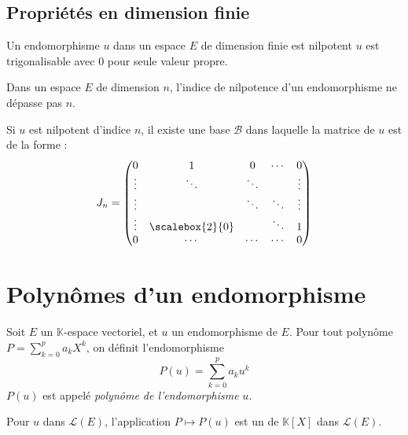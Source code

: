 \documentclass[11pt,a4paper,fleqn,pdftex]{report}
\begin{document}
\subsection{Propriétés en dimension finie} %
\label{sub:proprietes_en_dimension_finie}
\begin{theorem}
     Un endomorphisme $u$ dans un espace $E$ de dimension finie est nilpotent \ssi $u$ est trigonalisable avec $0$ pour seule valeur propre.
\end{theorem}
\begin{theorem}
     Dans un espace $E$ de dimension $n$, l'indice de nilpotence d'un endomorphisme ne dépasse pas $n$. \par
     Si $u$ est nilpotent d'indice $n$, il existe une base $\mathcal{B}$ dans laquelle la matrice de $u$ est de la forme :
     \begin{equation}
     J_n=
     \begin{pmatrix}
             0   &         1       &    0   & \cdots &    0   \\
          \vdots &      \ddots     & \ddots &        & \vdots \\
          \vdots &                 & \ddots & \ddots & \vdots \\
          \vdots & \scalebox{2}{0} &        & \ddots &    1   \\
             0   &      \cdots     & \cdots & \cdots &    0  
     \end{pmatrix}
     \end{equation}
\end{theorem}
\section{Polynômes d'un endomorphisme} %
\label{sec:polyn_mes_d_un_endomorphisme}
\begin{dfn}
     Soit $E$ un $\mathbb{K}$-espace vectoriel, et $u$ un endomorphisme de $E$. \newline
     Pour tout polynôme $P = \sum_{k=0}^p a_k X^k$, on définit l'endomorphisme 
     \begin{equation}
     P(u) = \sum_{k=0}^p a_k u^k
     \end{equation}
     $P(u)$ est appelé \emph{polynôme de l'endomorphisme} $u$.
\end{dfn}
\needspace{3cm}
\begin{theorem}
     Pour $u$ dans $\mathscr{L}(E)$, l'application $P \mapsto P(u)$ est un  de $\mathbb{K} [X]$ dans $\mathscr{L}(E)$.\\
\end{theorem}
\end{document}
